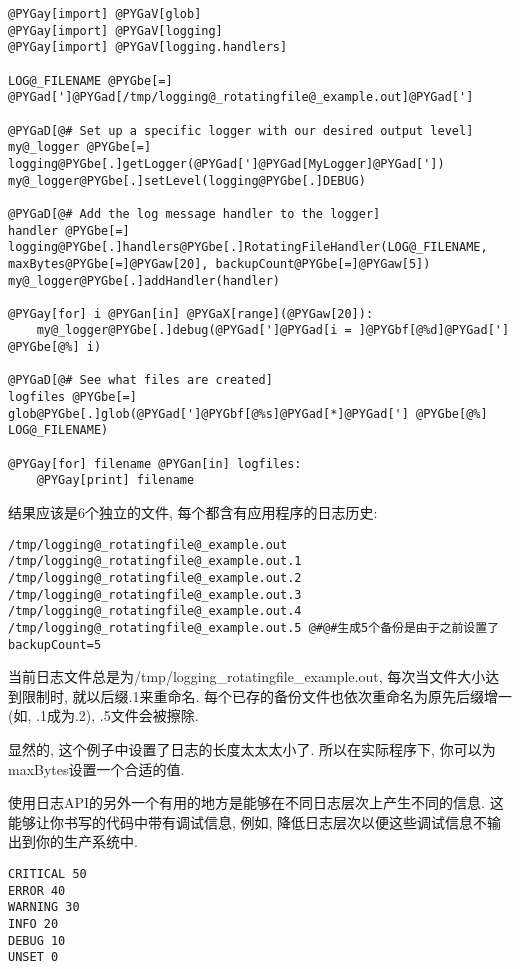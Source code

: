 \documentclass[a4paper,10pt,english]{manual}
\begin{document}
\begin{Verbatim}[commandchars=@\[\]]
@PYGay[import] @PYGaV[glob]
@PYGay[import] @PYGaV[logging]
@PYGay[import] @PYGaV[logging.handlers]

LOG@_FILENAME @PYGbe[=] @PYGad[']@PYGad[/tmp/logging@_rotatingfile@_example.out]@PYGad[']

@PYGaD[@# Set up a specific logger with our desired output level]
my@_logger @PYGbe[=] logging@PYGbe[.]getLogger(@PYGad[']@PYGad[MyLogger]@PYGad['])
my@_logger@PYGbe[.]setLevel(logging@PYGbe[.]DEBUG)

@PYGaD[@# Add the log message handler to the logger]
handler @PYGbe[=] logging@PYGbe[.]handlers@PYGbe[.]RotatingFileHandler(LOG@_FILENAME, maxBytes@PYGbe[=]@PYGaw[20], backupCount@PYGbe[=]@PYGaw[5])
my@_logger@PYGbe[.]addHandler(handler)

@PYGay[for] i @PYGan[in] @PYGaX[range](@PYGaw[20]):
    my@_logger@PYGbe[.]debug(@PYGad[']@PYGad[i = ]@PYGbf[@%d]@PYGad['] @PYGbe[@%] i)

@PYGaD[@# See what files are created]
logfiles @PYGbe[=] glob@PYGbe[.]glob(@PYGad[']@PYGbf[@%s]@PYGad[*]@PYGad['] @PYGbe[@%] LOG@_FILENAME)

@PYGay[for] filename @PYGan[in] logfiles:
    @PYGay[print] filename
\end{Verbatim}

结果应该是6个独立的文件, 每个都含有应用程序的日志历史:

\begin{Verbatim}[commandchars=@\[\]]
/tmp/logging@_rotatingfile@_example.out
/tmp/logging@_rotatingfile@_example.out.1
/tmp/logging@_rotatingfile@_example.out.2
/tmp/logging@_rotatingfile@_example.out.3
/tmp/logging@_rotatingfile@_example.out.4
/tmp/logging@_rotatingfile@_example.out.5 @#@#生成5个备份是由于之前设置了backupCount=5
\end{Verbatim}

当前日志文件总是为/tmp/logging\_rotatingfile\_example.out, 每次当文件大小达到限制时, 就以后缀.1来重命名. 每个已存的备份文件也依次重命名为原先后缀增一(如, .1成为.2), .5文件会被擦除.

显然的, 这个例子中设置了日志的长度太太太小了. 所以在实际程序下, 你可以为maxBytes设置一个合适的值.

使用日志API的另外一个有用的地方是能够在不同日志层次上产生不同的信息. 这能够让你书写的代码中带有调试信息, 例如, 降低日志层次以便这些调试信息不输出到你的生产系统中.

\begin{Verbatim}[commandchars=@\[\]]
CRITICAL 50
ERROR 40
WARNING 30
INFO 20
DEBUG 10
UNSET 0
\end{Verbatim}
\end{document}
